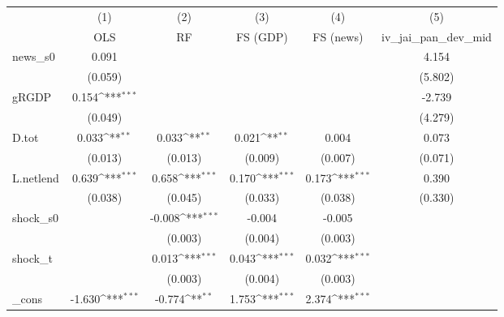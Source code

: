 {
\def\sym#1{\ifmmode^{#1}\else\(^{#1}\)\fi}
\begin{tabular}{l*{5}{c}}
\toprule
            &\multicolumn{1}{c}{(1)}&\multicolumn{1}{c}{(2)}&\multicolumn{1}{c}{(3)}&\multicolumn{1}{c}{(4)}&\multicolumn{1}{c}{(5)}\\
            &\multicolumn{1}{c}{OLS}&\multicolumn{1}{c}{RF}&\multicolumn{1}{c}{FS (GDP)}&\multicolumn{1}{c}{FS (news)}&\multicolumn{1}{c}{iv\_jai\_pan\_dev\_mid}\\
\midrule
news\_s0     &       0.091         &                     &                     &                     &       4.154         \\
            &     (0.059)         &                     &                     &                     &     (5.802)         \\
\addlinespace
gRGDP       &       0.154\sym{***}&                     &                     &                     &      -2.739         \\
            &     (0.049)         &                     &                     &                     &     (4.279)         \\
\addlinespace
D.tot       &       0.033\sym{**} &       0.033\sym{**} &       0.021\sym{**} &       0.004         &       0.073         \\
            &     (0.013)         &     (0.013)         &     (0.009)         &     (0.007)         &     (0.071)         \\
\addlinespace
L.netlend   &       0.639\sym{***}&       0.658\sym{***}&       0.170\sym{***}&       0.173\sym{***}&       0.390         \\
            &     (0.038)         &     (0.045)         &     (0.033)         &     (0.038)         &     (0.330)         \\
\addlinespace
shock\_s0    &                     &      -0.008\sym{***}&      -0.004         &      -0.005         &                     \\
            &                     &     (0.003)         &     (0.004)         &     (0.003)         &                     \\
\addlinespace
shock\_t     &                     &       0.013\sym{***}&       0.043\sym{***}&       0.032\sym{***}&                     \\
            &                     &     (0.003)         &     (0.004)         &     (0.003)         &                     \\
\addlinespace
\_cons      &      -1.630\sym{***}&      -0.774\sym{**} &       1.753\sym{***}&       2.374\sym{***}&                     \\

\end{tabular}}
